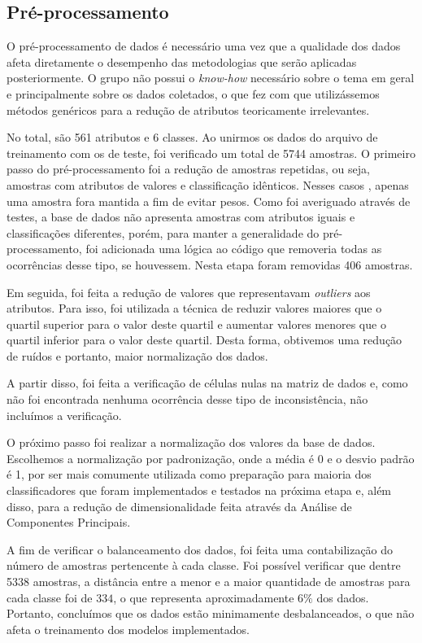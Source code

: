 \documentclass[10pt, conference, compsocconf]{IEEEtran}
\begin{document}
\subsection{Pré-processamento}\label{sec:pre_processamento}
O pré-processamento de dados é necessário uma vez que a qualidade 
dos dados afeta diretamente o desempenho das metodologias que serão aplicadas 
posteriormente. O grupo não possui o \textsl{know-how} necessário sobre o tema
em geral e principalmente sobre os dados coletados, 
o que fez com que utilizássemos métodos genéricos para a redução de atributos teoricamente irrelevantes.

No total, são 561 atributos e 6 classes. Ao unirmos os dados do arquivo de
treinamento com os de teste, foi verificado um total de 5744 amostras.
O primeiro passo do pré-processamento foi a redução de amostras repetidas, ou 
seja, amostras com atributos de valores e classificação idênticos. Nesses casos
, apenas uma amostra fora mantida a fim de evitar pesos. Como foi averiguado 
através de testes, a base de dados não apresenta amostras com atributos iguais e
classificações diferentes, porém, para manter a generalidade do
pré-processamento, foi adicionada uma lógica ao código que removeria todas as 
ocorrências desse tipo, se houvessem. Nesta etapa foram removidas 406 amostras.

Em seguida, foi feita a redução de valores que representavam \textsl{outliers} 
aos atributos. Para isso, foi utilizada a técnica de reduzir valores maiores 
que o quartil superior para o valor deste quartil e aumentar valores menores 
que o quartil inferior para o valor deste quartil. Desta forma, obtivemos uma 
redução de ruídos e portanto, maior normalização dos dados.

A partir disso, foi feita a verificação de células nulas na matriz de dados
e, como não foi encontrada nenhuma ocorrência desse tipo de inconsistência, 
não incluímos a verificação.

O próximo passo foi realizar a normalização dos valores da base de dados. Escolhemos 
a normalização por padronização, onde a média é 0 e o desvio padrão é 1, por 
ser mais comumente utilizada como preparação para maioria dos classificadores
que foram implementados e testados na próxima etapa e, além disso, para a redução 
de dimensionalidade feita através da Análise de Componentes Principais.

A fim de verificar o balanceamento dos dados, foi feita uma contabilização do número 
de amostras pertencente à cada classe. Foi possível verificar que dentre 5338 
amostras, a distância entre a menor e a maior quantidade de amostras para cada 
classe foi de $334$, o que representa aproximadamente $6\%$ dos dados. Portanto, 
concluímos que os dados estão minimamente desbalanceados, o que não afeta o
treinamento dos modelos implementados.
\end{document}
